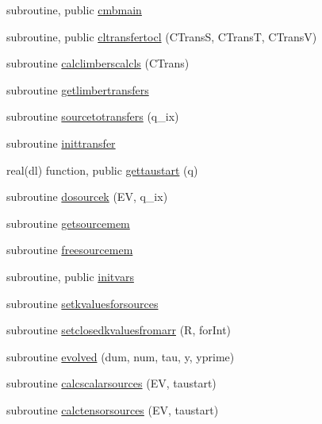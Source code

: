 \begin{DoxyCompactItemize}
\item 
subroutine, public \mbox{\hyperlink{namespacecambmain_a8863977991a108f96a26fc99e8c5e129}{cmbmain}}
\item 
subroutine, public \mbox{\hyperlink{namespacecambmain_a15c0f01f07762c709f8f718935153d7a}{cltransfertocl}} (C\+TransS, C\+TransT, C\+TransV)
\item 
subroutine \mbox{\hyperlink{namespacecambmain_ad3f7f4af84395bc4648bcc82e81e8861}{calclimberscalcls}} (C\+Trans)
\item 
subroutine \mbox{\hyperlink{namespacecambmain_ae71666c61f08659e1870539ab6230f02}{getlimbertransfers}}
\item 
subroutine \mbox{\hyperlink{namespacecambmain_ad84747dc28d2ff66a818a46c3eb5f574}{sourcetotransfers}} (q\+\_\+ix)
\item 
subroutine \mbox{\hyperlink{namespacecambmain_a556b6e83160b14e40cffab6e0deb6e12}{inittransfer}}
\item 
real(dl) function, public \mbox{\hyperlink{namespacecambmain_affb3c10eee60a6f657ccf1c0f0abd693}{gettaustart}} (q)
\item 
subroutine \mbox{\hyperlink{namespacecambmain_a9ff2ea693941648b6f34d86e019f9613}{dosourcek}} (EV, q\+\_\+ix)
\item 
subroutine \mbox{\hyperlink{namespacecambmain_af7f170a39e21214fe3b389f74dbb183d}{getsourcemem}}
\item 
subroutine \mbox{\hyperlink{namespacecambmain_a47cd48fe0174b214ddc23bcdd91b6754}{freesourcemem}}
\item 
subroutine, public \mbox{\hyperlink{namespacecambmain_a890ea024560967d80a83e411a34368ed}{initvars}}
\item 
subroutine \mbox{\hyperlink{namespacecambmain_a63fe5ba29fa3c5116ef8bc646e7aa09c}{setkvaluesforsources}}
\item 
subroutine \mbox{\hyperlink{namespacecambmain_a96c41c9fdee3e69fba450a460df25472}{setclosedkvaluesfromarr}} (R, for\+Int)
\item 
subroutine \mbox{\hyperlink{namespacecambmain_a8861dfd3252de9c7b39b9c09ee415010}{evolved}} (dum, num, tau, y, yprime)
\item 
subroutine \mbox{\hyperlink{namespacecambmain_ab6fa8682eb65308c413e6501a9b5417c}{calcscalarsources}} (EV, taustart)
\item 
subroutine \mbox{\hyperlink{namespacecambmain_ad933d804e4a0a4ae8bdf2754e608458d}{calctensorsources}} (EV, taustart)
\item 

\end{DoxyCompactItemize}
